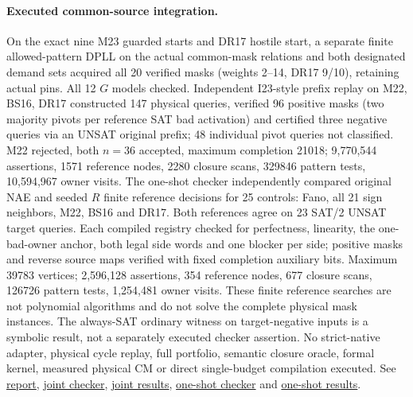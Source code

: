\documentclass[11pt]{article}
\begin{document}
\paragraph{Executed common-source integration.}
On the exact nine M23 guarded starts and DR17 hostile start, a separate finite allowed-pattern DPLL on the actual common-mask relations and both designated demand sets acquired all 20 verified masks (weights 2--14, DR17 9/10), retaining actual pins. All 12 $G$ models checked. Independent I23-style prefix replay on M22, BS16, DR17 constructed 147 physical queries, verified 96 positive masks (two majority pivots per reference SAT bad activation) and certified three negative queries via an UNSAT original prefix; 48 individual pivot queries not classified. M22 rejected, both $n=36$ accepted, maximum completion 21018; 9,770,544 assertions, 1571 reference nodes, 2280 closure scans, 329846 pattern tests, 10,594,967 owner visits. The one-shot checker independently compared original NAE and seeded $R$ finite reference decisions for 25 controls: Fano, all 21 sign neighbors, M22, BS16 and DR17. Both references agree on 23 SAT/2 UNSAT target queries. Each compiled registry checked for perfectness, linearity, the one-bad-owner anchor, both legal side words and one blocker per side; positive masks and reverse source maps verified with fixed completion auxiliary bits. Maximum 39783 vertices; 2,596,128 assertions, 354 reference nodes, 677 closure scans, 126726 pattern tests, 1,254,481 owner visits. These finite reference searches are not polynomial algorithms and do not solve the complete physical mask instances. The always-SAT ordinary witness on target-negative inputs is a symbolic result, not a separately executed checker assertion. No strict-native adapter, physical cycle replay, full portfolio, semantic closure oracle, formal kernel, measured physical CM or direct single-budget compilation executed.
See \href{https://github.com/j15marti/pnp/commit/4a6f11453e361d311410571da87c18db9f50acea}{report}, \href{https://github.com/j15marti/pnp/commit/bf970a7258799fdfaa4115a622860db6caf8f4ac}{joint checker}, \href{https://github.com/j15marti/pnp/commit/6429d3f8a31fcd3523d2c972008829a5609e618e}{joint results}, \href{https://github.com/j15marti/pnp/commit/0ea57879019ac93059a1392bdf33773b8f8735b7}{one-shot checker} and \href{https://github.com/j15marti/pnp/commit/40f539288fdc9e37012486282d36a23178b91725}{one-shot results}.
\end{document}
